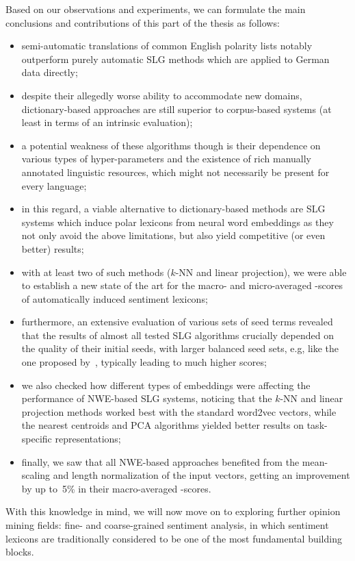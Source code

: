 Based on our observations and experiments, we can formulate the main
conclusions and contributions of this part of the thesis as follows:
\begin{itemize}
\item semi-automatic translations of common English polarity lists
  notably outperform purely automatic SLG methods which are applied to
  German data directly;
\item despite their allegedly worse ability to accommodate new
  domains, dictionary-based approaches are still superior to
  corpus-based systems (at least in terms of an intrinsic evaluation);
\item a potential weakness of these algorithms though is their
  dependence on various types of hyper-parameters and the existence of
  rich manually annotated linguistic resources, which might not
  necessarily be present for every language;
\item in this regard, a viable alternative to dictionary-based methods
  are SLG systems which induce polar lexicons from neural word
  embeddings as they not only avoid the above limitations, but also
  yield competitive (or even better) results;
\item with at least two of such methods ($k$-NN and linear
  projection), we were able to establish a new state of the art for
  the macro- and micro-averaged \F-scores of automatically induced
  sentiment lexicons;
\item furthermore, an extensive evaluation of various sets of seed
  terms revealed that the results of almost all tested SLG algorithms
  crucially depended on the quality of their initial seeds, with
  larger balanced seed sets, e.g, like the one proposed
  by~\citet{Kim:04}, typically leading to much higher scores;
\item we also checked how different types of embeddings were affecting
  the performance of NWE-based SLG systems, noticing that the $k$-NN
  and linear projection methods worked best with the standard word2vec
  vectors, while the nearest centroids and PCA algorithms yielded
  better results on task-specific representations;
\item finally, we saw that all NWE-based approaches benefited from the
  mean-scaling and length normalization of the input vectors, getting
  an improvement by up to~5\% in their macro-averaged \F-scores.
\end{itemize}

With this knowledge in mind, we will now move on to exploring further
opinion mining fields: fine- and coarse-grained sentiment analysis, in
which sentiment lexicons are traditionally considered to be one of the
most fundamental building blocks.
